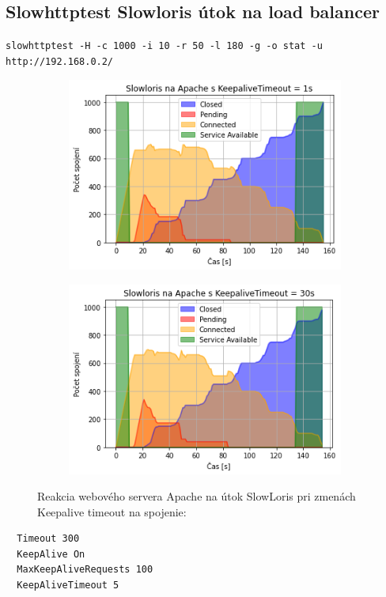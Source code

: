 \documentclass[12pt, a4paper]{article}
\begin{document}
\subsection{Slowhttptest Slowloris útok na load balancer}
\begin{lrbox}{\shield}
\verb|slowhttptest -H -c 1000 -i 10 -r 50 -l 180 -g -o stat -u http://192.168.0.2/|
\end{lrbox}
\begin{figure}[h!]
	\centering
	\begin{subfigure}[t]{.48\textwidth}
  		\centering
  		\includegraphics[width=\textwidth]{images/Apache-slowhttptest-1s.png}
	\end{subfigure}
	\begin{subfigure}[t]{.48\textwidth}
  		\centering
  		\includegraphics[width=\textwidth]{images/Apache-slowhttptest-30s.png}
	\end{subfigure}
	\caption{Reakcia webového servera Apache na útok SlowLoris pri zmenách Keepalive timeout
	na spojenie: \\ \usebox{\shield}}
\end{figure}
\begin{lstlisting}
  Timeout 300
  KeepAlive On
  MaxKeepAliveRequests 100
  KeepAliveTimeout 5
\end{lstlisting}
\end{document}
